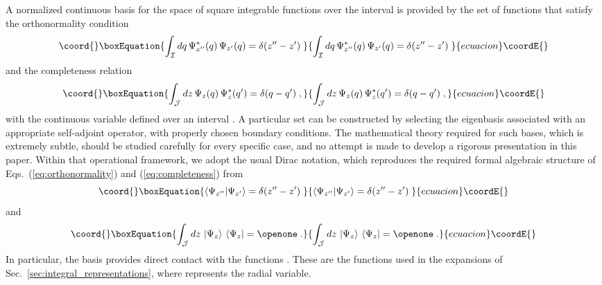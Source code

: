 \documentclass[a4paper,preprint,draft,showpacs,amsmath,amsfonts,amssymb,aps,prd]{revtex4}%
\begin{document}
A normalized continuous basis
for the space of square integrable functions over the interval
\coordHE{}
is provided by the set of
functions \coordHE{}
that satisfy the orthonormality condition
\begin{equation}\coord{}\boxEquation{
\int_{\mathcal I}
dq
\,
\Psi_{z''}^{*}(q) \, \Psi_{z'} (q)
=\delta (z''-z')
\;
\label{eq:orthonormality}
}{
\int_{\mathcal I}
dq
\,
\Psi_{z''}^{*}(q) \, \Psi_{z'} (q)
=\delta (z''-z')
\;
}{ecuacion}\coordE{}\end{equation}
and
the completeness relation
\begin{equation}\coord{}\boxEquation{
\int_{\mathcal J}
dz 
\,
\Psi_{z} (q) \, \Psi_{z}^{*} (q')
= \delta (q-q')
\;  ,
\label{eq:completeness}
}{
\int_{\mathcal J}
dz 
\,
\Psi_{z} (q) \, \Psi_{z}^{*} (q')
= \delta (q-q')
\;  ,
}{ecuacion}\coordE{}\end{equation} 
with the continuous
variable \coordHE{} defined over an interval
\coordHE{}.
A particular set
\coordHE{} can be constructed
by selecting the eigenbasis associated with an appropriate self-adjoint operator,
with properly chosen boundary conditions.
The mathematical theory required for such bases, which is extremely subtle,
should be studied carefully for every specific case,
and no attempt is made to develop a rigorous presentation in this paper.
Within that operational 
framework, we adopt the usual 
Dirac notation, which reproduces 
the required formal algebraic structure of
Eqs.~(\ref{eq:orthonormality}) 
and (\ref{eq:completeness}) from
\begin{equation}\coord{}\boxEquation{
\left\langle 
\Psi_{z''} 
|
\Psi_{z'} 
\right\rangle
= \delta (z''-z')
\;
\label{eq:orthonormality_Dirac}
}{
\left\langle 
\Psi_{z''} 
|
\Psi_{z'} 
\right\rangle
= \delta (z''-z')
\;
}{ecuacion}\coordE{}\end{equation}
and
\begin{equation}\coord{}\boxEquation{
\int_{\mathcal J}
dz 
\,
\left|
\Psi_{z} 
\right\rangle
\,
\left\langle 
\Psi_{z} 
\right|
=
\openone
\;  .
\label{eq:completeness_Dirac}
}{
\int_{\mathcal J}
dz 
\,
\left|
\Psi_{z} 
\right\rangle
\,
\left\langle 
\Psi_{z} 
\right|
=
\openone
\;  .
}{ecuacion}\coordE{}\end{equation} 
In particular, the  basis \coordHE{}
provides direct contact with
the functions \coordHE{}.
 These are the functions used in the expansions of
 Sec.~\ref{sec:integral_representations},
where \coordHE{} represents the radial variable.
\end{document}
